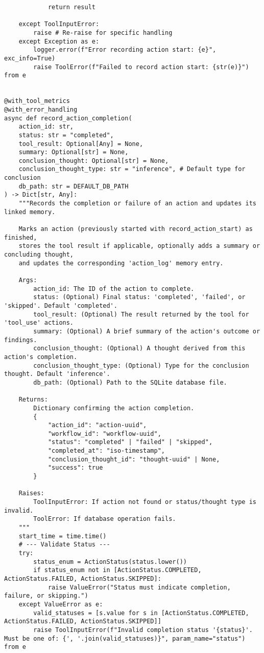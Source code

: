 \documentclass[12pt,a4paper]{article}
\begin{document}
\begin{pageablecode}
\begin{verbatim}
            return result

    except ToolInputError:
        raise # Re-raise for specific handling
    except Exception as e:
        logger.error(f"Error recording action start: {e}", exc_info=True)
        raise ToolError(f"Failed to record action start: {str(e)}") from e
    

@with_tool_metrics
@with_error_handling
async def record_action_completion(
    action_id: str,
    status: str = "completed",
    tool_result: Optional[Any] = None,
    summary: Optional[str] = None,
    conclusion_thought: Optional[str] = None,
    conclusion_thought_type: str = "inference", # Default type for conclusion
    db_path: str = DEFAULT_DB_PATH
) -> Dict[str, Any]:
    """Records the completion or failure of an action and updates its linked memory.

    Marks an action (previously started with record_action_start) as finished,
    stores the tool result if applicable, optionally adds a summary or concluding thought,
    and updates the corresponding 'action_log' memory entry.

    Args:
        action_id: The ID of the action to complete.
        status: (Optional) Final status: 'completed', 'failed', or 'skipped'. Default 'completed'.
        tool_result: (Optional) The result returned by the tool for 'tool_use' actions.
        summary: (Optional) A brief summary of the action's outcome or findings.
        conclusion_thought: (Optional) A thought derived from this action's completion.
        conclusion_thought_type: (Optional) Type for the conclusion thought. Default 'inference'.
        db_path: (Optional) Path to the SQLite database file.

    Returns:
        Dictionary confirming the action completion.
        {
            "action_id": "action-uuid",
            "workflow_id": "workflow-uuid",
            "status": "completed" | "failed" | "skipped",
            "completed_at": "iso-timestamp",
            "conclusion_thought_id": "thought-uuid" | None,
            "success": true
        }

    Raises:
        ToolInputError: If action not found or status/thought type is invalid.
        ToolError: If database operation fails.
    """
    start_time = time.time()
    # --- Validate Status ---
    try:
        status_enum = ActionStatus(status.lower())
        if status_enum not in [ActionStatus.COMPLETED, ActionStatus.FAILED, ActionStatus.SKIPPED]:
            raise ValueError("Status must indicate completion, failure, or skipping.")
    except ValueError as e:
        valid_statuses = [s.value for s in [ActionStatus.COMPLETED, ActionStatus.FAILED, ActionStatus.SKIPPED]]
        raise ToolInputError(f"Invalid completion status '{status}'. Must be one of: {', '.join(valid_statuses)}", param_name="status") from e


\end{verbatim}
\end{pageablecode}
\end{document}
